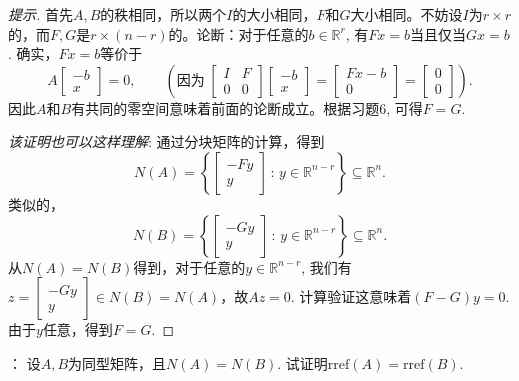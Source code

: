 \documentclass[UTF8]{ctexart}
\newcommand{\rref}{\mathrm{rref}}
\begin{document}
\begin{proof}[提示] 首先$A,B$的秩相同，所以两个$I$的大小相同，$F$和$G$大小相同。不妨设$I$为$r\times r$的，而$F,G$是$r\times (n-r)$的。论断：对于任意的$b\in\mathbb{R}^r$, 有$Fx = b$当且仅当$Gx=b$. 确实，$Fx=b$等价于
\begin{equation*}
A\begin{bmatrix}-b \\ x\end{bmatrix} =   0,
\qquad (\text{因为}\; \begin{bmatrix}
		I & F\\0&0
	\end{bmatrix} \begin{bmatrix}-b \\ x\end{bmatrix} =\begin{bmatrix}Fx-b \\ 0\end{bmatrix} = \begin{bmatrix}0 \\ 0\end{bmatrix}).
\end{equation*}
因此$A$和$B$有共同的零空间意味着前面的论断成立。根据习题6, 可得$F=G$.

\smallskip

\emph{该证明也可以这样理解}: 通过分块矩阵的计算，得到
\begin{equation*}
N(A) = \left\{\begin{bmatrix}-Fy\\y\end{bmatrix} \,:\, y\in \mathbb{R}^{n-r}\right\} \subseteq \mathbb{R}^n.
\end{equation*}
类似的，
\begin{equation*}
N(B) = \left\{\begin{bmatrix}-Gy\\y\end{bmatrix} \,:\, y\in \mathbb{R}^{n-r}\right\} \subseteq \mathbb{R}^n.
\end{equation*}
从$N(A)=N(B)$得到，对于任意的$y\in \mathbb{R}^{n-r}$, 我们有$z = \begin{bmatrix}-Gy\\y\end{bmatrix} \in N(B) = N(A)$，故$Az = 0$. 计算验证这意味着$(F-G)y=0$. 由于$y$任意，得到$F=G$.
\end{proof}

\vspace{2cm}
：
设$A,B$为同型矩阵，且$N(A) = N(B)$. 试证明$\rref(A) = \rref(B)$.
\end{document}
